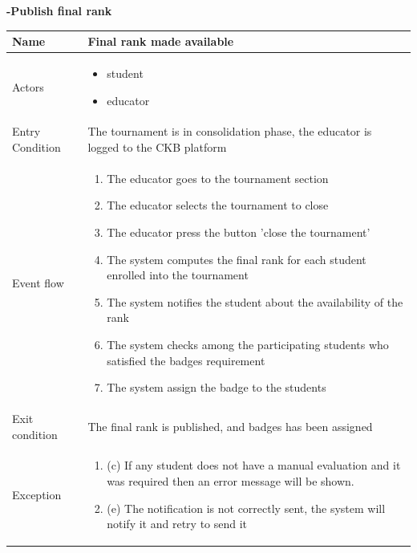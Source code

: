 \begin{enumerate}[label=\textbf{[UC\arabic*]}]
\begin{tabular}{|l|p{11cm}|}
        \hline            
    \end{tabular}
\newpage
        \item  \textbf{-Publish final rank}
    \\ \begin{tabular}{|l|p{11cm}|}
        \hline
        Name & Final rank made available \\
        \hline
        Actors & \begin{itemize}
                    \item student
                    \item educator
                \end{itemize} \\
        \hline
        Entry Condition & The tournament is in consolidation phase, the educator is logged to the CKB platform \\
        \hline
        Event flow & \begin{enumerate}
            \item The educator goes to the tournament section
            \item The educator selects the tournament to close
            \item The educator press the button 'close the tournament'
            \item The system computes the final rank for each student enrolled into the tournament
            \item The system notifies the student about the availability of the rank
            \item The system checks among the participating students who satisfied the badges requirement
            \item The system assign the badge to the students
        \end{enumerate}\\
        \hline
        Exit condition &  The final rank is published, and badges has been assigned \\
        \hline
        Exception & \begin{enumerate}  [label={}, leftmargin=0.25cm ]
            \item (c) If any student does not have a manual evaluation and it was required then an error message will be shown.
            \item (e) The notification is not correctly sent, the system will notify it and retry to send it
        \end{enumerate}\\ 
        \hline            
    \end{tabular}



\end{enumerate}

